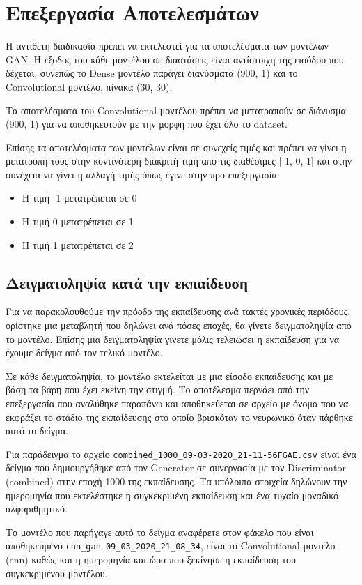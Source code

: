 \section{Επεξεργασία Αποτελεσμάτων}
Η αντίθετη διαδικασία πρέπει να εκτελεστεί για τα αποτελέσματα των μοντέλων GAN. Η έξοδος του κάθε μοντέλου σε διαστάσεις είναι αντίστοιχη της εισόδου που δέχεται, συνεπώς το Dense μοντέλο παράγει διανύσματα (900, 1) και το Convolutional μοντέλο, πίνακα (30, 30).
\par
Τα αποτελέσματα του Convolutional μοντέλου πρέπει να μετατραπούν σε διάνυσμα (900, 1) για να αποθηκευτούν με την μορφή που έχει όλο το dataset.
\par
Επίσης τα αποτελέσματα των μοντέλων είναι σε συνεχείς τιμές και πρέπει να γίνει η μετατροπή τους στην κοντινότερη διακριτή τιμή από τις διαθέσιμες [-1, 0, 1] και στην συνέχεια να γίνει η αλλαγή τιμής όπως έγινε στην προ επεξεργασία:
\begin{itemize}
\item Η τιμή -1 μετατρέπεται σε 0
\item Η τιμή 0 μετατρέπεται σε 1
\item Η τιμή 1 μετατρέπεται σε 2
\end{itemize}


\subsection{Δειγματοληψία κατά την εκπαίδευση}
Για να παρακολουθούμε την πρόοδο της εκπαίδευσης ανά τακτές χρονικές περιόδους, ορίστηκε μια μεταβλητή που δηλώνει ανά πόσες εποχές, θα γίνετε δειγματοληψία από το μοντέλο. Επίσης μια δειγματοληψία γίνετε μόλις τελειώσει η εκπαίδευση για να έχουμε δείγμα από τον τελικό μοντέλο. 
\par
Σε κάθε δειγματοληψία, το μοντέλο εκτελείται με μια είσοδο εκπαίδευσης και με βάση τα βάρη που έχει εκείνη την στιγμή. Το αποτέλεσμα περνάει από την επεξεργασία που αναλύθηκε παραπάνω και αποθηκεύεται σε αρχείο με όνομα που να εκφράζει το στάδιο της εκπαίδευσης στο οποίο βρισκόταν το νευρωνικό όταν πάρθηκε αυτό το δείγμα.
\par
Για παράδειγμα το αρχείο \verb|combined_1000_09-03-2020_21-11-56FGAE.csv| είναι ένα δείγμα που δημιουργήθηκε από τον Generator σε συνεργασία με τον Discriminator (combined) στην εποχή 1000 της εκπαίδευσης. Τα υπόλοιπα στοιχεία δηλώνουν την ημερομηνία που εκτελέστηκε η συγκεκριμένη εκπαίδευση και ένα τυχαίο μοναδικό αλφαριθμητικό. 
\par
Το μοντέλο που παρήγαγε αυτό το δείγμα αναφέρετε στον φάκελο που είναι αποθηκευμένο \verb|cnn_gan-09_03_2020_21_08_34|, είναι το Convolutional μοντέλο (cnn) καθώς και η ημερομηνία και ώρα που ξεκίνησε η εκπαίδευση του συγκεκριμένου μοντέλου.

